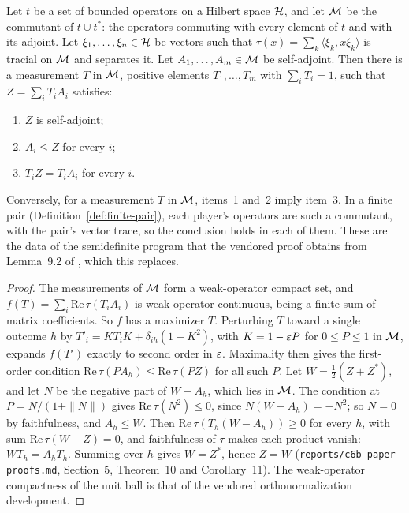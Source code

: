 \begin{theorem}
\label{thm:summed-sdp}
\leanok
Let $t$ be a set of bounded operators on a Hilbert space $\mH$, and let $\cal{M}$ be the commutant
of $t \cup t^*$: the operators commuting with every element of $t$ and with its adjoint.
Let $\xi_1, \dots, \xi_n \in \mH$ be vectors such that $\tau(x) = \sum_k \langle \xi_k, x \xi_k
\rangle$ is tracial on $\cal{M}$ and separates it. Let $A_1, \dots, A_m \in \cal{M}$ be self-adjoint.
Then there is a measurement $T$ in $\cal{M}$, positive elements $T_1, \dots, T_m$ with $\sum_i T_i =
1$, such that $Z = \sum_i T_i A_i$ satisfies:
\begin{enumerate}
  \item $Z$ is self-adjoint;
  \item $A_i \leq Z$ for every $i$;
  \item $T_i Z = T_i A_i$ for every $i$.
\end{enumerate}
Conversely, for a measurement $T$ in $\cal{M}$, items~1 and~2 imply item~3. In a finite pair
(Definition~\ref{def:finite-pair}), each player's operators are such a commutant, with the pair's
vector trace, so the conclusion holds in each of them. These are the data of the semidefinite
program that the vendored proof obtains from Lemma~9.2 of \cite{JNVWY21qld}, which this replaces.
\end{theorem}

\begin{proof}
\leanok
The measurements of $\cal{M}$ form a weak-operator compact set, and $f(T) = \sum_i \mathrm{Re}\,
\tau(T_i A_i)$ is weak-operator continuous, being a finite sum of matrix coefficients. So $f$ has
a maximizer $T$. Perturbing $T$ toward a single outcome $h$ by $T'_i = K T_i K + \delta_{ih}(1 -
K^2)$, with $K = 1 - \eps P$ for $0 \leq P \leq 1$ in $\cal{M}$, expands $f(T')$ exactly to second
order in $\eps$. Maximality then gives the first-order condition $\mathrm{Re}\, \tau(P A_h) \leq
\mathrm{Re}\, \tau(P Z)$ for all such $P$. Let $W = \frac{1}{2}(Z + Z^*)$, and let $N$ be the
negative part of $W - A_h$, which lies in $\cal{M}$. The condition at $P = N / (1 + \|N\|)$ gives
$\mathrm{Re}\, \tau(N^2) \leq 0$, since $N (W - A_h) = -N^2$; so $N = 0$ by faithfulness, and $A_h
\leq W$. Then
$\mathrm{Re}\, \tau(T_h (W - A_h)) \geq 0$ for every $h$, with sum $\mathrm{Re}\, \tau(W - Z) = 0$, and
faithfulness of $\tau$ makes each product vanish: $W T_h = A_h T_h$. Summing over $h$ gives $W =
Z^*$, hence $Z = W$ (\texttt{reports/c6b-paper-proofs.md}, Section~5, Theorem~10 and
Corollary~11). The weak-operator compactness of the unit ball is that of the vendored
orthonormalization development.
\end{proof}

